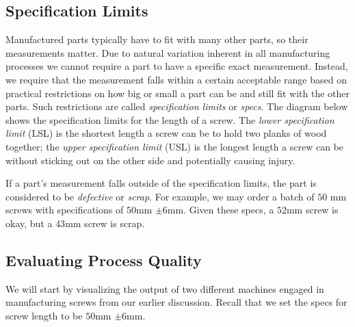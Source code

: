 \documentclass{ximera}
\begin{document}
\subsection*{Specification Limits}
Manufactured parts typically have to fit with many other parts, so their measurements matter. Due to natural variation inherent in all manufacturing processes we cannot require a part to have a specific exact measurement.  Instead, we require that the measurement falls within a certain acceptable range based on practical restrictions on how big or small a part can be and still fit with the other parts.  Such restrictions are called \emph{specification limits} or \emph{specs}.  The diagram below shows the specification limits for the length of a screw.  The \emph{lower specification limit} (LSL) is the shortest length a screw can be to hold two planks of wood together; the \emph{upper specification limit} (USL) is the longest length a screw can be without sticking out on the other side and potentially causing injury.

\begin{center}
      \end{center}

If a part's measurement falls outside of the specification limits, the part is considered to be \emph{defective} or \emph{scrap}.  For example, we may order a batch of $50$ mm screws with specifications of $50$mm $\pm 6$mm.   Given these specs, a $52$mm screw is okay, but a $43$mm screw is scrap.

\subsection*{Evaluating Process Quality}
We will start by visualizing the output of two different machines engaged in manufacturing screws from our earlier discussion.  Recall that we set the specs for screw length to be $50$mm $\pm 6$mm.  
\end{document}
